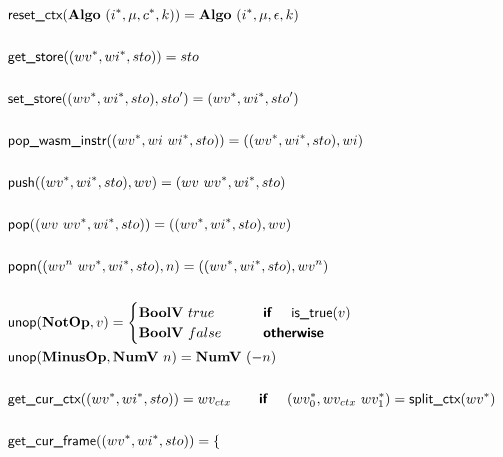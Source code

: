 \begin{align*}
\newline \\
  &\resetctx(\algo ~ (\seq i, \mu, \seq c, k)) = \algo ~ (\seq i, \mu, \epsilon, k) \\
%
\newline \\
  &\getstore((\seq{wv}, \seq{wi}, sto)) = sto \\
%
\newline \\
  &\setstore((\seq{wv}, \seq{wi}, sto), sto') = (\seq{wv}, \seq{wi}, sto') \\
%
\newline \\
  &\popwasminstr((\seq{wv}, wi ~ \seq{wi}, sto)) = ((\seq{wv}, \seq{wi}, sto), wi) \\
%
\newline \\
  &\push((\seq{wv}, \seq{wi}, sto), wv) = (wv ~ \seq{wv}, \seq{wi}, sto) \\
%
\newline \\
  &\pop((wv ~ \seq{wv}, \seq{wi}, sto)) = ((\seq{wv}, \seq{wi}, sto), wv) \\
%
\newline \\
  &\popn((wv^n ~ \seq{wv}, \seq{wi}, sto), n) = ((\seq{wv}, \seq{wi}, sto), wv^n) \\
%
\newline \\
  &\unop(\notop, v) =
    \begin{cases}
      \boolv ~ true &\quad\quad\premise{if}\quad ~ \istrue(v) \\
      \boolv ~ false &\quad\quad\premise{otherwise} \\
    \end{cases}
  \\
  &\unop(\minusop, \numv ~ n) = \numv ~ (-n) \\
%
\newline \\
  &\getcurctx((\seq{wv}, \seq{wi}, sto)) =
  wv_{ctx} \quad\quad\premise{if}\quad ~ (\seq{wv_0}, wv_{ctx} ~ \seq{wv_1}) = \splitctx(\seq{wv}) \\
%
\newline \\
  &\getcurframe((\seq{wv}, \seq{wi}, sto)) =
    \begin{cases}

\end{cases}
\end{align*}
